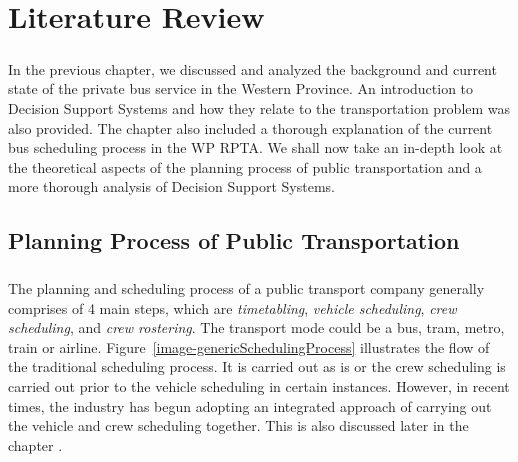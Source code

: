 
\chapter {Literature Review}
\label{chapter-LitReview}

\paragraph{ } In the previous chapter, we discussed and analyzed the background and current state of the private bus service in the Western Province. An introduction to Decision Support Systems and how they relate to the transportation problem was also provided. The chapter also included a thorough explanation of the current bus scheduling process in the WP RPTA. We shall now take an in-depth look at the theoretical aspects of the planning process of public transportation and a more thorough analysis of Decision Support Systems.

\section{Planning Process of Public Transportation}

\paragraph{ } The planning and scheduling process of a public transport company generally comprises of 4 main steps, which are \textit{timetabling}, \textit{vehicle scheduling}, \textit{crew scheduling}, and \textit{crew rostering}. The transport mode could be a bus, tram, metro, train or airline. Figure~\ref{image-genericSchedulingProcess} illustrates the flow of the traditional scheduling process. It is carried out as is or the crew scheduling is carried out prior to the vehicle scheduling in certain instances. However, in recent times, the industry has begun adopting an integrated approach of carrying out the vehicle and crew scheduling together. This is also discussed later in the chapter \cite{Huisman2004}.

